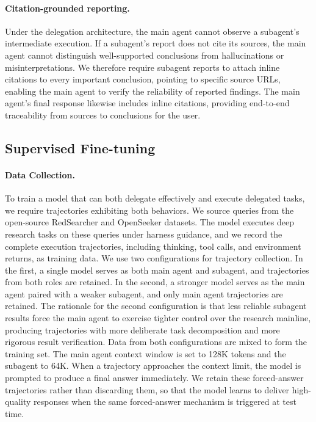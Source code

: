 \documentclass{llmxive}
\begin{document}
\paragraph{Citation-grounded reporting.}
Under the delegation architecture, the main agent cannot observe a subagent's intermediate execution. If a subagent's report does not cite its sources, the main agent cannot distinguish well-supported conclusions from hallucinations or misinterpretations. We therefore require subagent reports to attach inline citations to every important conclusion, pointing to specific source URLs, enabling the main agent to verify the reliability of reported findings. The main agent's final response likewise includes inline citations, providing end-to-end traceability from sources to conclusions for the user.

\subsection{Supervised Fine-tuning}

\paragraph{Data Collection.}
To train a model that can both delegate effectively and execute delegated tasks, we require trajectories exhibiting both behaviors. We source queries from the open-source RedSearcher \citep{chu2026redsearcher} and OpenSeeker \citep{du2026openseeker} datasets. The model executes deep research tasks on these queries under harness guidance, and we record the complete execution trajectories, including thinking, tool calls, and environment returns, as training data. We use two configurations for trajectory collection. In the first, a single model serves as both main agent and subagent, and trajectories from both roles are retained. In the second, a stronger model serves as the main agent paired with a weaker subagent, and only main agent trajectories are retained. The rationale for the second configuration is that less reliable subagent results force the main agent to exercise tighter control over the research mainline, producing trajectories with more deliberate task decomposition and more rigorous result verification. Data from both configurations are mixed to form the training set. The main agent context window is set to 128K tokens and the subagent to 64K. When a trajectory approaches the context limit, the model is prompted to produce a final answer immediately. We retain these forced-answer trajectories rather than discarding them, so that the model learns to deliver high-quality responses when the same forced-answer mechanism is triggered at test time.
\end{document}
